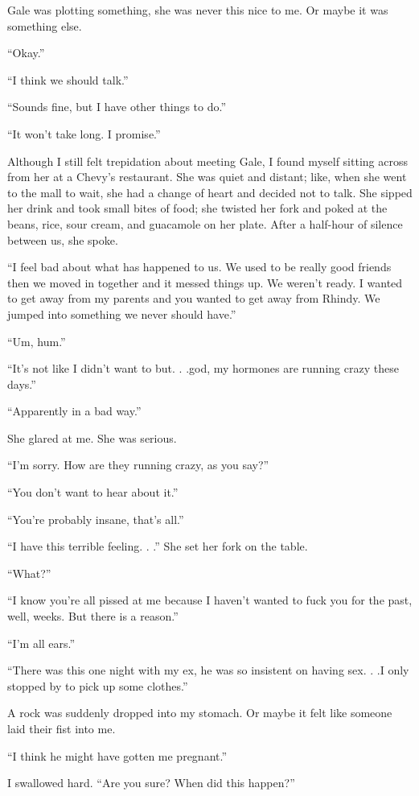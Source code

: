 Gale was plotting something, she was never this nice to me. Or maybe it
was something else.

``Okay.''

``I think we should talk.''

``Sounds fine, but I have other things to do.''

``It won't take long. I promise.''

Although I still felt trepidation about meeting Gale, I found myself
sitting across from her at a Chevy's restaurant. She was quiet and
distant; like, when she went to the mall to wait, she had a change of
heart and decided not to talk. She sipped her drink and took small bites
of food; she twisted her fork and poked at the beans, rice, sour cream,
and guacamole on her plate. After a half-hour of silence between us, she
spoke.

``I feel bad about what has happened to us. We used to be really good
friends then we moved in together and it messed things up. We weren't
ready. I wanted to get away from my parents and you wanted to get away
from Rhindy. We jumped into something we never should have.''

``Um, hum.''

``It's not like I didn't want to but. . .god, my hormones are running
crazy these days.''

``Apparently in a bad way.''

She glared at me. She was serious.

``I'm sorry. How are they running crazy, as you say?''

``You don't want to hear about it.''

``You're probably insane, that's all.''

``I have this terrible feeling. . .'' She set her fork on the table.

``What?''

``I know you're all pissed at me because I haven't wanted to fuck you
for the past, well, weeks. But there is a reason.''

``I'm all ears.''

``There was this one night with my ex, he was so insistent on having
sex. . .I only stopped by to pick up some clothes.''

A rock was suddenly dropped into my stomach. Or maybe it felt like
someone laid their fist into me.

``I think he might have gotten me pregnant.''

I swallowed hard. ``Are you sure? When did this happen?''

